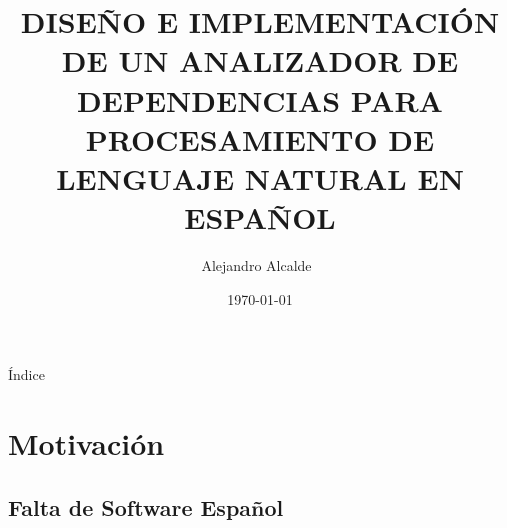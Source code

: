 \documentclass{beamer}
\title[Dep Parsing Castellano]%
{DISEÑO E IMPLEMENTACIÓN DE UN ANALIZADOR DE DEPENDENCIAS PARA PROCESAMIENTO DE LENGUAJE NATURAL EN ESPAÑOL} %
\author[A. Alcalde] %
{Alejandro Alcalde~\inst{1}}
\institute[ETSIIT] %
{
  \inst{1}%
  Grado Ingeniería Informática\\
  Universidad de Granada
}
\date[Diciembre 2016]{\today}
\begin{document}
\begin{frame}
  \titlepage
\end{frame}

\begin{frame}{Índice}
  \tableofcontents
\end{frame}





\section{Motivación}

\subsection{Falta de Software Español}

\newcommand*{\checktikz}[1][]{\tikz[x=1em, y=1em]\fill[#1] (0,.35) -- (.25,0) --
  (1,.7) -- (.25,.15) -- cycle;}
\newcommand*{\ccheck}{\checktikz[tick,rounded corners=.5pt, draw=tick,
  thin]} %
\end{document}
